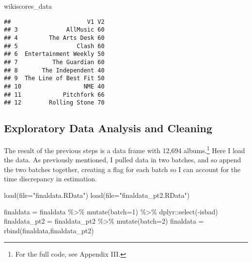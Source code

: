 \documentclass[
  11pt,
]{article}
\newenvironment{Shaded}{\begin{snugshade}}{\end{snugshade}}
\newcommand{\AttributeTok}[1]{\textcolor[rgb]{0.77,0.63,0.00}{#1}}
\newcommand{\DecValTok}[1]{\textcolor[rgb]{0.00,0.00,0.81}{#1}}
\newcommand{\FunctionTok}[1]{\textcolor[rgb]{0.00,0.00,0.00}{#1}}
\newcommand{\NormalTok}[1]{#1}
\newcommand{\OtherTok}[1]{\textcolor[rgb]{0.56,0.35,0.01}{#1}}
\newcommand{\SpecialCharTok}[1]{\textcolor[rgb]{0.00,0.00,0.00}{#1}}
\newcommand{\StringTok}[1]{\textcolor[rgb]{0.31,0.60,0.02}{#1}}
\begin{document}
\begin{Shaded}
\begin{Highlighting}[]
\NormalTok{wikiscores\_data}
\end{Highlighting}
\end{Shaded}

\begin{verbatim}
##                      V1 V2
## 3              AllMusic 60
## 4         The Arts Desk 60
## 5                 Clash 60
## 6  Entertainment Weekly 50
## 7          The Guardian 60
## 8       The Independent 40
## 9  The Line of Best Fit 50
## 10                  NME 40
## 11            Pitchfork 66
## 12        Rolling Stone 70
\end{verbatim}

\hypertarget{exploratory-data-analysis-and-cleaning}{%
\subsection{Exploratory Data Analysis and
Cleaning}\label{exploratory-data-analysis-and-cleaning}}

The result of the previous steps is a data frame with 12,694
albums.\footnote{For the full code, see Appendix III.} Here I load the
data. As previously mentioned, I pulled data in two batches, and so
append the two batches together, creating a flag for each batch so I can
account for the time discrepancy in estimation.

\begin{Shaded}
\begin{Highlighting}[]
\FunctionTok{load}\NormalTok{(}\AttributeTok{file=}\StringTok{"finaldata.RData"}\NormalTok{)}
\FunctionTok{load}\NormalTok{(}\AttributeTok{file=}\StringTok{"finaldata\_pt2.RData"}\NormalTok{)}

\NormalTok{finaldata }\OtherTok{=}\NormalTok{ finaldata }\SpecialCharTok{\%\textgreater{}\%}
  \FunctionTok{mutate}\NormalTok{(}\AttributeTok{batch=}\DecValTok{1}\NormalTok{) }\SpecialCharTok{\%\textgreater{}\%}
\NormalTok{  dplyr}\SpecialCharTok{::}\FunctionTok{select}\NormalTok{(}\SpecialCharTok{{-}}\NormalTok{isbad)}
\NormalTok{finaldata\_pt2 }\OtherTok{=}\NormalTok{ finaldata\_pt2 }\SpecialCharTok{\%\textgreater{}\%} \FunctionTok{mutate}\NormalTok{(}\AttributeTok{batch=}\DecValTok{2}\NormalTok{)}
\NormalTok{finaldata }\OtherTok{=} \FunctionTok{rbind}\NormalTok{(finaldata,finaldata\_pt2)}
\end{Highlighting}
\end{Shaded}
\end{document}
